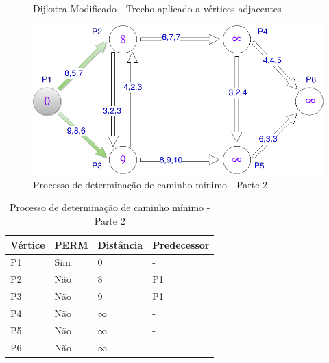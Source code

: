 \begin{figure}[htbp]
\centering
\caption{Dijkstra Modificado - Trecho aplicado a vértices adjacentes}
\label{fig:diMod}
\end{figure}
\FloatBarrier

\begin{figure}[htbp]
\centering
 \includegraphics[width=.50\textwidth]{chapters/fig/leo3.png}
\caption{Processo de determinação de caminho mínimo - Parte 2}
\label{fig:leo3}
\end{figure}

\begin{table}[htbp]
	\centering
	\begin{tabular}{l l l l}
	\toprule
	Vértice & PERM & Distância & Predecessor\\
	\midrule
	P1 & Sim & 0 & - \\
	P2 & Não & 8 & P1 \\
	P3 & Não & 9 & P1 \\
	P4 & Não & $\infty$ & - \\
	P5 & Não & $\infty$ & - \\
	P6 & Não & $\infty$ & - \\
	\bottomrule
	\end{tabular}
\caption{Processo de determinação de caminho mínimo - Parte 2}
 \label{tab:leotab2}
\end{table}
\FloatBarrier

